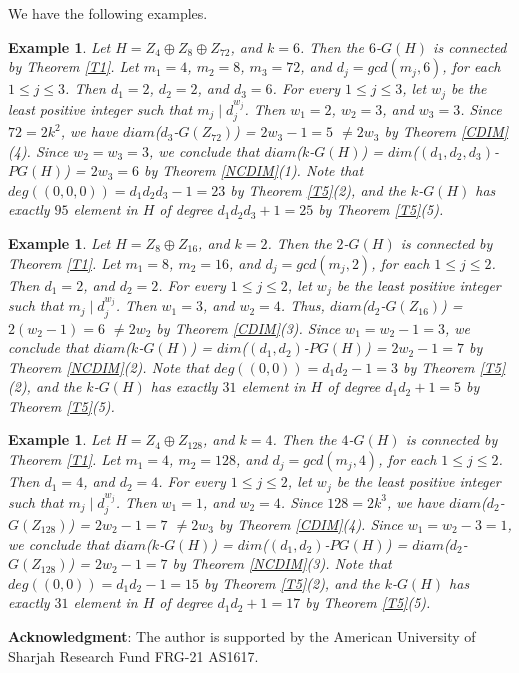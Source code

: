 \documentclass{amsart}
\theoremstyle{plain}
\newtheorem{exa}[thm]{Example}
\begin{document}
			We have the following examples.
			\begin{exa}
			Let $H = Z_4\oplus Z_{8}\oplus Z_{72}$, and $k = 6$. Then the $6$-$G(H)$ is connected by Theorem \ref{T1}. Let $m_1 = 4$, $m_2 = 8$, $m_3 = 72$, and $d_j = gcd(m_j, 6)$, for each $1\leq j \leq 3$. Then $d_1 = 2$, $d_2 = 2$, and $d_3 = 6$. For every $1\leq j \leq 3$, let $w_j$ be the least positive integer such that $m_j \mid d_j^{w_j}$. Then $w_1 = 2$, $w_2 = 3$, and $w_3 = 3$. Since $72 = 2k^2$, we have $diam$($d_3$-$G(Z_{72})$) = $2w_3 - 1 = 5$ $\not = 2w_3$ by Theorem \ref{CDIM}(4). Since $w_2 = w_3 = 3$, we conclude that $diam$($k$-$G(H)$) = $dim$($(d_1, d_2, d_3)$-$PG(H)$) = $2w_3 = 6$ by Theorem \ref{NCDIM}(1). Note that $deg((0, 0, 0)) = d_1d_2d_3 - 1 = 23$ by Theorem \ref{T5}(2), and the $k$-$G(H)$ has exactly $95$ element in $H$ of degree $d_1d_2d_3 + 1 = 25$ by Theorem \ref{T5}(5).  
					
			\end{exa}
			\begin{exa}
				Let $H = Z_8\oplus Z_{16}$, and $k = 2$. Then the $2$-$G(H)$ is connected by Theorem \ref{T1}. Let $m_1 = 8$, $m_2 = 16$, and $d_j = gcd(m_j, 2)$, for each $1\leq j \leq 2$. Then $d_1 = 2$, and $d_2 = 2$. For every $1\leq j \leq 2$, let $w_j$ be the least positive integer such that $m_j \mid d_j^{w_j}$. Then $w_1 = 3$, and $w_2 = 4$. Thus,  $diam$($d_2$-$G(Z_{16})$) = $2(w_2 - 1) = 6$ $\not = 2w_2$ by Theorem \ref{CDIM}(3). Since $w_1 = w_2 - 1 = 3$, we conclude that $diam$($k$-$G(H)$) = $dim$($(d_1, d_2)$-$PG(H)$) = $2w_2 - 1 = 7$ by Theorem \ref{NCDIM}(2). Note that $deg((0, 0)) = d_1d_2 - 1 = 3$ by Theorem \ref{T5}(2), and the $k$-$G(H)$ has exactly $31$ element in $H$ of degree $d_1d_2 + 1 = 5$ by Theorem \ref{T5}(5).  
				
			\end{exa}
			\begin{exa}
				Let $H = Z_4\oplus Z_{128}$, and $k = 4$. Then the $4$-$G(H)$ is connected by Theorem \ref{T1}. Let $m_1 = 4$, $m_2 = 128$, and $d_j = gcd(m_j, 4)$, for each $1\leq j \leq 2$. Then $d_1 = 4$, and $d_2 = 4$. For every $1\leq j \leq 2$, let $w_j$ be the least positive integer such that $m_j \mid d_j^{w_j}$. Then $w_1 = 1$, and $w_2 = 4$. Since $128 = 2k^3$, we have $diam$($d_2$-$G(Z_{128})$) = $2w_2 - 1 = 7$ $\not = 2w_3$ by Theorem \ref{CDIM}(4). Since $w_1 = w_2 - 3 = 1$, we conclude that $diam$($k$-$G(H)$) = $dim$($(d_1, d_2)$-$PG(H)$) = $diam$($d_2$-$G(Z_{128})$) = $2w_2 - 1 = 7$ by Theorem \ref{NCDIM}(3). Note that $deg((0, 0)) = d_1d_2 - 1 = 15$ by Theorem \ref{T5}(2), and the $k$-$G(H)$ has exactly $31$ element in $H$ of degree $d_1d_2 + 1 = 17$ by Theorem \ref{T5}(5).  
				
			\end{exa}
\vskip0.2in
	{\bf Acknowledgment}: The author is supported by the American University of Sharjah Research Fund FRG-21 AS1617.
\end{document}
